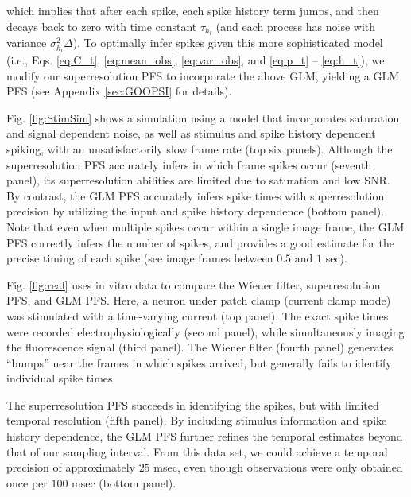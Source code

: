 \documentclass[10pt]{article}
\begin{document}
\noindent which implies that after each spike, each spike history term jumps, and then decays back to zero with time constant $\tau_{h_l}$ (and each process has noise with variance $\sigma_{h_l}^2 \Delta$). To optimally infer spikes given this more sophisticated model (i.e., Eqs. \ref{eq:C_t}, \ref{eq:mean_obs}, \ref{eq:var_obs}, and \ref{eq:p_t} -- \ref{eq:h_t}), we modify our superresolution PFS to incorporate the above GLM, yielding a GLM PFS (see Appendix \ref{sec:GOOPSI} for details).

Fig. \ref{fig:StimSim} shows a simulation using a model that incorporates saturation and signal dependent noise, as well as stimulus and spike history dependent spiking, with an unsatisfactorily slow frame rate (top six panels). Although the superresolution PFS accurately infers in which frame spikes occur (seventh panel), its superresolution abilities are limited due to saturation and low SNR.  By contrast, the GLM PFS accurately infers spike times with superresolution precision by utilizing the input and spike history dependence (bottom panel). Note that even when multiple spikes occur within a single image frame, the GLM PFS correctly infers the number of spikes, and provides a good estimate for the precise timing of each spike (see image frames between $0.5$ and $1$ sec). 

Fig. \ref{fig:real} uses in vitro data to compare the Wiener filter, superresolution PFS, and GLM PFS.  Here, a neuron under patch clamp (current clamp mode) was stimulated with a time-varying current (top panel).  The exact spike times were recorded electrophysiologically (second panel), while simultaneously imaging the fluorescence signal (third panel).  The Wiener filter (fourth panel) generates ``bumps'' near the frames in which spikes arrived, but generally fails to identify individual spike times.  

The superresolution PFS succeeds in identifying the spikes, but with limited temporal resolution (fifth panel).  By including stimulus information and spike history dependence, the GLM PFS further refines the temporal estimates beyond that of our sampling interval.  From this data set, we could achieve a temporal precision of approximately $25$ msec, even though observations were only obtained once per $100$ msec (bottom panel).  %
\end{document}
